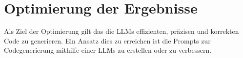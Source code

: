 

\section{Optimierung der Ergebnisse}
Als Ziel der Optimierung gilt das die LLMs effizienten, präzisen und korrekten Code zu generieren. Ein Ansatz dies zu erreichen ist die Prompts zur Codegenerierung mithilfe einer LLMs zu erstellen oder zu verbessern.




